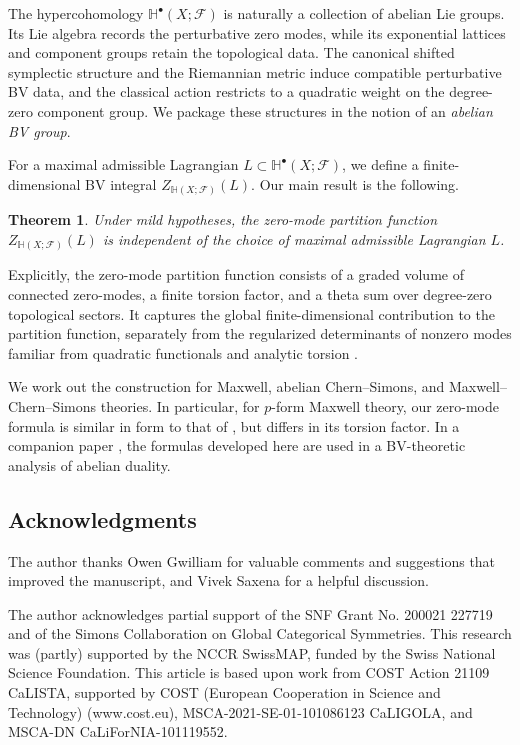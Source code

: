 \documentclass[12pt]{amsart}
\numberwithin{table}{section}
\numberwithin{equation}{section}
\newtheorem*{thm*}{Theorem}
\theoremstyle{plain}
\newcommand{\sF}{\mathcal{F}}
\begin{document}
The hypercohomology $\mathbb H^\bullet(X;\sF)$ is naturally a collection of abelian Lie groups. Its Lie algebra records the perturbative zero modes, while its exponential lattices and component groups retain the topological data. The canonical shifted symplectic structure and the Riemannian metric induce compatible perturbative BV data, and the classical action restricts to a quadratic weight on the degree-zero component group. We package these structures in the notion of an \emph{abelian BV group}.

For a maximal admissible Lagrangian $L\subset\mathbb H^\bullet(X;\sF)$, we define a finite-dimensional BV integral $Z_{\mathbb H(X;\sF)}(L)$. Our main result is the following.
\begin{thm*}
	Under mild hypotheses, the zero-mode partition function $Z_{\mathbb H(X;\sF)}(L)$ is independent of the choice of maximal admissible Lagrangian $L$.
\end{thm*}

Explicitly, the zero-mode partition function consists of a graded volume of connected zero-modes, a finite torsion factor, and a theta sum over degree-zero topological sectors. It captures the global finite-dimensional contribution to the partition function, separately from the regularized determinants of nonzero modes familiar from quadratic functionals and analytic torsion \cite{RaySinger1971,Schwarz1978}.

We work out the construction for Maxwell, abelian Chern--Simons, and Maxwell--Chern--Simons theories. In particular, for $p$-form Maxwell theory, our zero-mode formula is similar in form to that of \cite{MooreSaxena}, but differs in its torsion factor. In a companion paper \cite{JiangLiZabzine}, the formulas developed here are used in a BV-theoretic analysis of abelian duality.

\subsection*{Acknowledgments}

The author thanks Owen Gwilliam for valuable comments and suggestions that improved the manuscript, and Vivek Saxena for a helpful discussion.

The author acknowledges partial support of the SNF Grant No. 200021 227719 and of the Simons Collaboration on Global Categorical Symmetries. This research was (partly) supported by the NCCR SwissMAP, funded by the Swiss National Science Foundation. This article is based upon work from COST Action 21109 CaLISTA, supported by COST (European Cooperation in Science and Technology) (www.cost.eu), MSCA-2021-SE-01-101086123 CaLIGOLA, and MSCA-DN CaLiForNIA-101119552.
\end{document}
